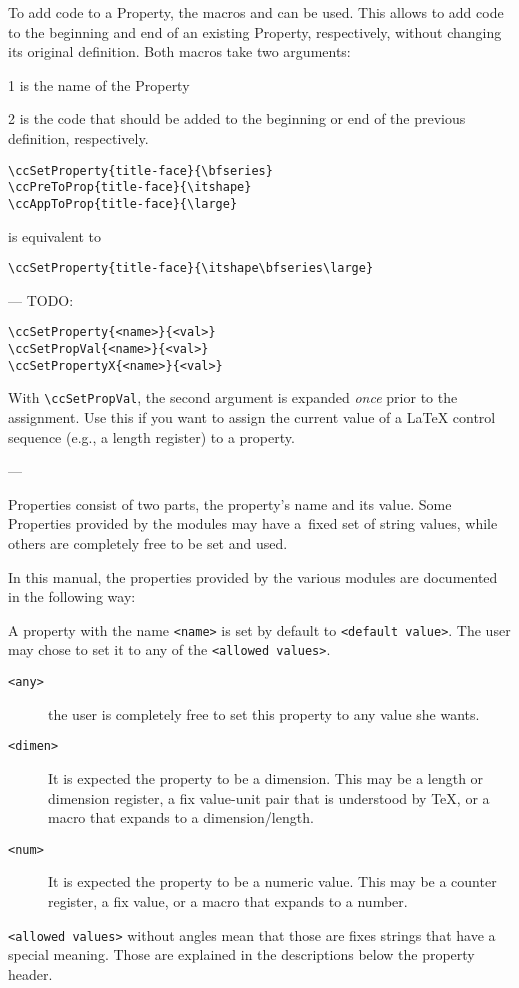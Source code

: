 To add code to a Property, the macros \DescribeMacro{\ccAppToProp} and
\DescribeMacro{\ccPreToProp} can be used. This allows to add code to
the beginning and end of an existing Property, respectively, without
changing its original definition. Both macros take two arguments:
\begin{ArgList}
\item[1] is the name of the Property
\item[2] is the code that should be added to the beginning or end of
  the previous definition, respectively.
\end{ArgList}
\begin{lstlisting}
\ccSetProperty{title-face}{\bfseries}
\ccPreToProp{title-face}{\itshape}
\ccAppToProp{title-face}{\large}
\end{lstlisting}
is equivalent to
\begin{lstlisting}
\ccSetProperty{title-face}{\itshape\bfseries\large}
\end{lstlisting}


---
TODO:

\begin{lstlisting}[style=tex]
\ccSetProperty{<name>}{<val>}
\ccSetPropVal{<name>}{<val>}
\ccSetPropertyX{<name>}{<val>}
\end{lstlisting}
With \lstinline{\ccSetPropVal}, the second argument is expanded \textit{once}
prior to the assignment. Use this if you want to assign the current
value of a {\LaTeX} control sequence (e.g., a length register) to a
property.


---


Properties consist of two parts, the property's name and its
value. Some Properties provided by the {\CoCoTeX} modules may have
a~fixed set of string values, while others are completely free to be
set and used.

In this manual, the properties provided by the various modules are
documented in the following way:


A property with the name \texttt{<name>} is set by default to
\texttt{<default value>}. The user may chose to set it to any of the
\texttt{<allowed values>}.
\begin{description}
\item[\texttt{<any>}]  the user is completely free to set this
  property to any value she wants.
\item[\texttt{<dimen>}] It is expected the property to be a
  dimension. This may be a length or dimension register, a fix
  value-unit pair that is understood by \TeX, or a macro that expands
  to a dimension/length.
\item[\texttt{<num>}] It is expected the property to be a numeric
  value. This may be a counter register, a fix value, or a macro that
  expands to a number.
\end{description}
\lstinline{<allowed values>} without angles mean that those are fixes
strings that have a special meaning. Those are explained in the
descriptions below the property header.

